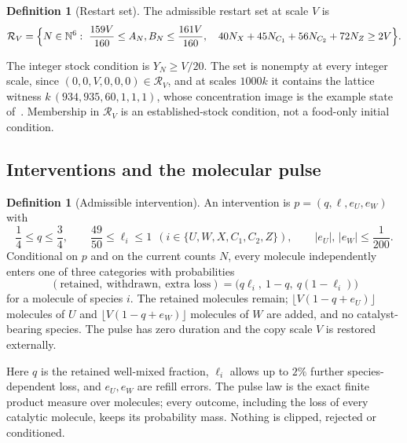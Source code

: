 \documentclass[11pt,a4paper]{article}
\theoremstyle{plain}
\theoremstyle{definition}
\newtheorem{definition}[theorem]{Definition}
\theoremstyle{remark}
\newcommand{\N}{\mathbb N}
\newcommand{\cR}{\mathcal R}
\begin{document}
\begin{definition}[Restart set]\label{def:restart}
The admissible restart set at scale $V$ is
\begin{equation}\label{eq:restart}
\cR_V=\Bigl\{N\in\N^6:\ \frac{159V}{160}\le A_N,B_N\le\frac{161V}{160},\quad 40N_X+45N_{C_1}+56N_{C_2}+72N_Z\ge2V\Bigr\}.
\end{equation}
\end{definition}
The integer stock condition is $Y_N\ge V/20$. The set is nonempty at every integer scale, since $(0,0,V,0,0,0)\in\cR_V$, and at scales $1000k$ it contains the lattice witness $k\,(934,935,60,1,1,1)$, whose concentration image is the example state of~\citep{recovery2026}. Membership in $\cR_V$ is an established-stock condition, not a food-only initial condition.

\subsection{Interventions and the molecular pulse}\label{sec:pulse-def}
\begin{definition}[Admissible intervention]\label{def:intervention}
An intervention is $p=(q,\ell,e_U,e_W)$ with
\begin{equation}\label{eq:pulsebounds}
\frac14\le q\le\frac34,\qquad \frac{49}{50}\le\ell_i\le1\ \ (i\in\{U,W,X,C_1,C_2,Z\}),\qquad |e_U|,\,|e_W|\le\frac1{200}.
\end{equation}
Conditional on $p$ and on the current counts $N$, every molecule independently enters one of three categories with probabilities
\begin{equation}\label{eq:pulse}
(\text{retained},\ \text{withdrawn},\ \text{extra loss})=\bigl(q\ell_i,\ 1-q,\ q(1-\ell_i)\bigr)
\end{equation}
for a molecule of species $i$. The retained molecules remain; $\lfloor V(1-q+e_U)\rfloor$ molecules of $U$ and $\lfloor V(1-q+e_W)\rfloor$ molecules of $W$ are added, and no catalyst-bearing species. The pulse has zero duration and the copy scale $V$ is restored externally.
\end{definition}
Here $q$ is the retained well-mixed fraction, $\ell_i$ allows up to $2\%$ further species-dependent loss, and $e_U,e_W$ are refill errors. The pulse law is the exact finite product measure over molecules; every outcome, including the loss of every catalytic molecule, keeps its probability mass. Nothing is clipped, rejected or conditioned.
\end{document}
